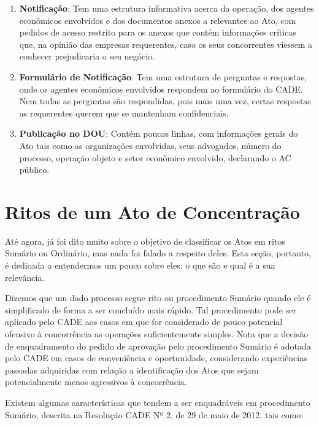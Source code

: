 \documentclass[11pt]{report}
\begin{document}
\begin{enumerate}[label=\textbf{\arabic*.}]
\item \textbf{Notificação}: Tem uma estrutura informativa acerca da operação, dos agentes econômicos envolvidos e dos documentos anexos a relevantes ao Ato, com pedidos
de acesso restrito para os anexos que contém informações críticas que, na opinião das empresas requerentes, caso os seus concorrentes viessem a conhecer prejudicaria o seu negócio.
\item \textbf{Formulário de Notificação}: Tem uma estrutura de perguntas e respostas, onde os agentes econômicos envolvidos respondem ao formulário do CADE. Nem todas as perguntas
são respondidas, pois mais uma vez, certas respostas as requerentes querem que se mantenham confidenciais.
\item \textbf{Publicação no DOU}: Contém poucas linhas, com informações gerais do Ato tais como as organizações envolvidas, seus advogados, número do processo, operação objeto
e setor econômico envolvido, declarando o AC público.
\end{enumerate}

\section{Ritos de um Ato de Concentração}

\indent\indent Até agora, já foi dito muito sobre o objetivo de classificar os Atos em ritos Sumário ou Ordinário, mas nada foi falado a respeito deles. Esta seção, portanto,
é dedicada a entendermos um pouco sobre eles: o que são e  qual é a sua relevância.

\indent Dizemos que um dado processo segue rito ou procedimento Sumário quando ele é simplificado de forma a ser concluído mais rápido. Tal procedimento pode ser
aplicado pelo CADE aos casos em que for considerado de pouco potencial ofensivo à concorrência as operações suficientemente simples. Nota que a decisão de enquadramento do pedido
de aprovação pelo procedimento Sumário é adotada pelo CADE em casos de conveniência e oportunidade, considerando experiências passadas adquiridas com relação a identificação
dos Atos que sejam potencialmente menos agressivos à concorrência.

Existem algumas características que tendem a ser enquadráveis em procedimento Sumário, descrita na Resolução CADE Nº 2, de 29 de maio de 2012, tais como:
\end{document}
